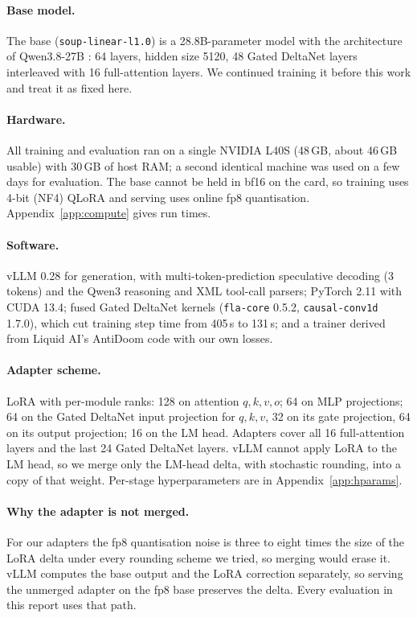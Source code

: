 \documentclass[11pt]{article}
\begin{document}
\paragraph{Base model.} The base (\texttt{soup-linear-l1.0}) is a 28.8B-parameter model with the architecture of Qwen3.8-27B \citep{qwen38}: 64 layers, hidden size 5120, 48 Gated DeltaNet layers \citep{yang2025gdn} interleaved with 16 full-attention layers. We continued training it before this work and treat it as fixed here.

\paragraph{Hardware.} All training and evaluation ran on a single NVIDIA L40S (48\,GB, about 46\,GB usable) with 30\,GB of host RAM; a second identical machine was used on a few days for evaluation. The base cannot be held in bf16 on the card, so training uses 4-bit (NF4) QLoRA \citep{dettmers2023qlora} and serving uses online fp8 quantisation. Appendix~\ref{app:compute} gives run times.

\paragraph{Software.} vLLM 0.28 \citep{kwon2023vllm} for generation, with multi-token-prediction speculative decoding (3 tokens) and the Qwen3 reasoning and XML tool-call parsers; PyTorch 2.11 with CUDA 13.4; fused Gated DeltaNet kernels (\texttt{fla-core} 0.5.2, \texttt{causal-conv1d} 1.7.0), which cut training step time from 405\,s to 131\,s; and a trainer derived from Liquid AI's AntiDoom code with our own losses.

\paragraph{Adapter scheme.} LoRA \citep{hu2022lora} with per-module ranks: 128 on attention $q,k,v,o$; 64 on MLP projections; 64 on the Gated DeltaNet input projection for $q,k,v$, 32 on its gate projection, 64 on its output projection; 16 on the LM head. Adapters cover all 16 full-attention layers and the last 24 Gated DeltaNet layers. vLLM cannot apply LoRA to the LM head, so we merge only the LM-head delta, with stochastic rounding, into a copy of that weight. Per-stage hyperparameters are in Appendix~\ref{app:hparams}.

\paragraph{Why the adapter is not merged.} For our adapters the fp8 quantisation noise is three to eight times the size of the LoRA delta under every rounding scheme we tried, so merging would erase it. vLLM computes the base output and the LoRA correction separately, so serving the unmerged adapter on the fp8 base preserves the delta. Every evaluation in this report uses that path.
\end{document}
